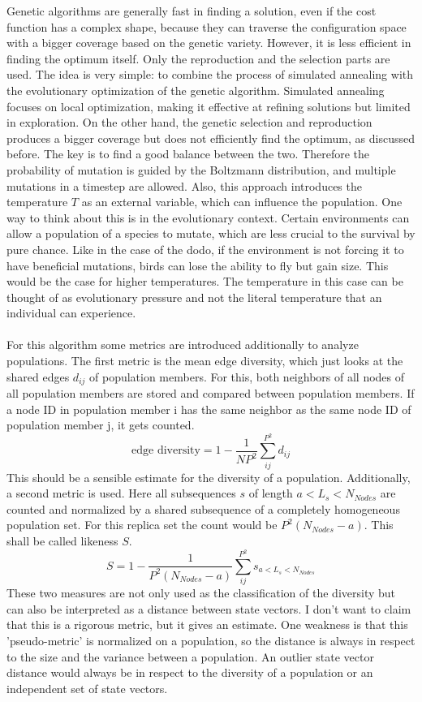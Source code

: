 Genetic algorithms are generally fast in finding a solution, even if the cost function has a complex shape, because they can traverse the configuration space with a bigger coverage based on the genetic variety.
However, it is less efficient in finding the optimum itself. Only the reproduction and the selection parts are used. 
The idea is very simple: to combine the process of simulated annealing with the evolutionary optimization of the genetic algorithm.
Simulated annealing focuses on local optimization, making it effective at refining solutions but limited in exploration.
On the other hand, the genetic selection and reproduction produces a bigger coverage but does not efficiently find the optimum, as discussed before.
The key is to find a good balance between the two.
Therefore the probability of mutation is guided by the Boltzmann distribution, and multiple mutations in a timestep are allowed.
Also, this approach introduces the temperature $T$ as an external variable, which can influence the population.
One way to think about this is in the evolutionary context.
Certain environments can allow a population of a species to mutate, which are less crucial to the survival by pure chance.
Like in the case of the dodo, if the environment is not forcing it to have beneficial mutations, birds can lose the ability to fly but gain size.
This would be the case for higher temperatures.
The temperature in this case can be thought of as evolutionary pressure and not the literal temperature that an individual can experience. \\ \\ 
For this algorithm some metrics are introduced additionally to analyze populations. 
The first metric is the mean edge diversity, which just looks at the shared edges $d_{ij}$ of population members.
For this, both neighbors of all nodes of all population members are stored and compared between population members.
If a node ID in population member i has the same neighbor as the same node ID of population member j, it gets counted.  
\begin{equation}
   \text{edge diversity} = 1 - \frac{1}{NP^2}\sum_{ij}^{P^2} d_{ij}
\end{equation}
This should be a sensible estimate for the diversity of a population.
Additionally, a second metric is used. 
Here all subsequences $s$ of length $a<L_s<N_{Nodes}$ are counted and normalized by a shared subsequence of a completely homogeneous population set. 
For this replica set the count would be $P^2 (N_{Nodes} - a)$.
This shall be called likeness $S$.
\begin{equation}
    S = 1 - \frac{1}{P^2 (N_{Nodes} - a)}\sum_{ij}^{P^2} s_{a<L_s<N_{Nodes}}
\end{equation}
These two measures are not only used as the classification of the diversity but can also be interpreted as a distance between state vectors.
I don't want to claim that this is a rigorous metric, but it gives an estimate. 
One weakness is that this 'pseudo-metric' is normalized on a population, so the distance is always in respect to the size and the variance between a population. 
An outlier state vector distance would always be in respect to the diversity of a population or an independent set of state vectors.